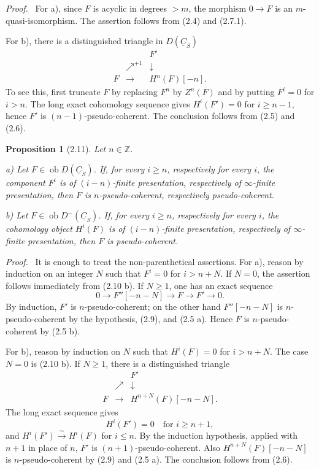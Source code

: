 \documentclass[13pt]{extarticle}
\newcommand{\ZZ}{\mathbb Z}
\newcommand{\uC}{\underline C}
\newcommand{\ob}{\operatorname{ob}}
\newcommand{\iso}{\xrightarrow{\sim}}
\newenvironment{prooftext}[1][Proof]{\par\noindent\emph{#1.}\ }{\par\medskip}
\newtheorem*{proposition*}{Proposition}
\begin{document}
\begin{prooftext}
For a), since $F$ is acyclic in degrees $>m$, the morphism $0\to F$ is an $m$-quasi-isomorphism. The assertion follows from (2.4) and (2.7.1).

For b), there is a distinguished triangle in $D(\uC_S)$
\[
\begin{array}{ccc}
&&F'\\
&\nearrow^{+1}&\downarrow\\
F&\longrightarrow&H^n(F)[-n].
\end{array}
\]
To see this, first truncate $F$ by replacing $F^n$ by $Z^n(F)$ and by putting $F^i=0$ for $i>n$. The long exact cohomology sequence gives $H^i(F')=0$ for $i\geq n-1$, hence $F'$ is $(n-1)$-pseudo-coherent. The conclusion follows from (2.5) and (2.6).
\end{prooftext}

\begin{proposition*}[2.11]
Let $n\in\ZZ$.

\textup{a)} Let $F\in\ob D(\uC_S)$. If, for every $i\geq n$, respectively for every $i$, the component $F^i$ is of $(i-n)$-finite presentation, respectively of $\infty$-finite presentation, then $F$ is $n$-pseudo-coherent, respectively pseudo-coherent.

\textup{b)} Let $F\in\ob D^-(\uC_S)$. If, for every $i\geq n$, respectively for every $i$, the cohomology object $H^i(F)$ is of $(i-n)$-finite presentation, respectively of $\infty$-finite presentation, then $F$ is pseudo-coherent.
\end{proposition*}

\begin{prooftext}
It is enough to treat the non-parenthetical assertions. For a), reason by induction on an integer $N$ such that $F^i=0$ for $i>n+N$. If $N=0$, the assertion follows immediately from (2.10 b). If $N\geq1$, one has an exact sequence
\[
0\longrightarrow F''[-n-N]\longrightarrow F\longrightarrow F'\longrightarrow0.
\]
By induction, $F'$ is $n$-pseudo-coherent; on the other hand $F''[-n-N]$ is $n$-pseudo-coherent by the hypothesis, (2.9), and (2.5 a). Hence $F$ is $n$-pseudo-coherent by (2.5 b).

For b), reason by induction on $N$ such that $H^i(F)=0$ for $i>n+N$. The case $N=0$ is (2.10 b). If $N\geq1$, there is a distinguished triangle
\[
\begin{array}{ccc}
&&F'\\
&\nearrow&\downarrow\\
F&\longrightarrow&H^{n+N}(F)[-n-N].
\end{array}
\]
The long exact sequence gives
\[
H^i(F')=0\quad\text{for }i\geq n+1,
\]
and $H^i(F')\iso H^i(F)$ for $i\leq n$. By the induction hypothesis, applied with $n+1$ in place of $n$, $F'$ is $(n+1)$-pseudo-coherent. Also $H^{n+N}(F)[-n-N]$ is $n$-pseudo-coherent by (2.9) and (2.5 a). The conclusion follows from (2.6).
\end{prooftext}
\end{document}
